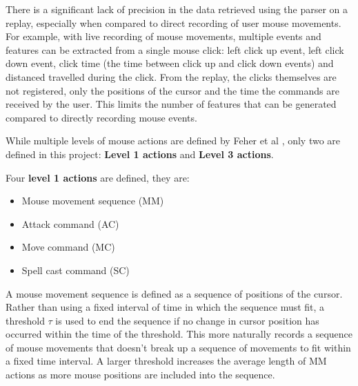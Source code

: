 \documentclass[Report.tex]{subfiles}
\begin{document}
There is a significant lack of precision in the data retrieved using the parser on a replay, especially when compared to direct recording of user mouse movements. For example, with live recording of mouse movements, multiple events and features can be extracted from a single mouse click: left click up event, left click down event, click time (the time between click up and click down events) and distanced travelled during the click. From the replay, the clicks themselves are not registered, only the positions of the cursor and the time the commands are received by the user. This limits the number of features that can be generated compared to directly recording mouse events.

While multiple levels of mouse actions are defined by Feher et al \cite{mouse-dynamics}, only two are defined in this project: \textbf{Level 1 actions} and \textbf{Level 3 actions}.

Four \textbf{level 1 actions} are defined, they are:
\begin{itemize}
\item Mouse movement sequence (MM)
\item Attack command (AC)
\item Move command (MC)
\item Spell cast command (SC)
\end{itemize}
A mouse movement sequence is defined as a sequence of positions of the cursor. Rather than using a fixed interval of time in which the sequence must fit, a threshold $\tau$ is used to end the sequence if no change in cursor position has occurred within the time of the threshold. This more naturally records a sequence of mouse movements that doesn't break up a sequence of movements to fit within a fixed time interval. A larger threshold increases the average length of MM actions as more mouse positions are included into the sequence. 
\end{document}
